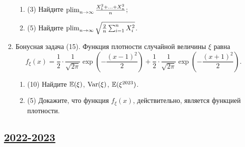 \begin{enumerate}
  \begin{enumerate}
  \item (3) Найдите $\operatorname*{plim}_{n \to \infty} \frac{X_1^2 + \ldots + X_n^2}{n}$;
  \item (5) Найдите $\operatorname*{plim}_{n \to \infty}  \sqrt{\frac{2}{n} \sum_{i=1}^n X_i^2}$.
  \end{enumerate}
  
  
  
\item Бонусная задача  (15).
  Функция плотности случайной величины $\xi$ равна
  \[
  f_{\xi}(x)=\frac{1}{2} \cdot \frac{1}{\sqrt{2 \pi}} 
    \exp(-\frac{(x-1)^2}{2})+\frac{1}{2} \cdot \frac{1}{\sqrt{2 \pi}} \exp(-\frac{(x+1)^2}{2}).
  \]
  \begin{enumerate}
  \item (10) Найдите $\operatorname{\mathbb{E}}(\xi)$, $\operatorname{Var}(\xi)$, $\operatorname{\mathbb{E}}(\xi^{2023})$.
  \item (5) Докажите, что функция $f_{\xi}(x)$, действительно, является функцией плотности.
  \end{enumerate}
  
  
  
\end{enumerate}


\subsection[2022-2023]{\hyperref[sec:sol_kr_02_2022_2023]{2022-2023}}
\label{sec:kr_02_2022_2023}


